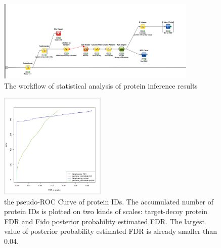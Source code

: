 \begin{figure}[htbp]
  \centering
  \includegraphics[width=0.85\textwidth]{graphics/protein_inference/ProteinInferenceKNIME_workflow.pdf}
  \caption{The workflow of statistical analysis of protein inference results}
  \label{fig:proteininference}
\end{figure}

\begin{figure}[htbp]
  \centering
  \includegraphics[width=0.45\textwidth]{graphics/protein_inference/proteinFDR.png}
  \caption{the pseudo-ROC Curve of protein IDs. The accumulated number of protein IDs is plotted on two kinds of scales: target-decoy protein FDR and Fido posterior probability estimated FDR. The largest value of posterior probability estimated FDR is already smaller than 0.04.}
  \label{fig:proteinfdr}
\end{figure}

                                                                                                                      
